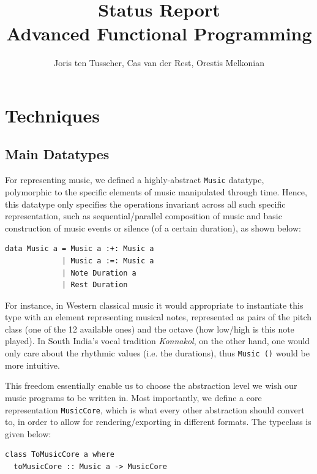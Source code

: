 \documentclass[11pt,a4paper]{article}
\title{\textbf{Status Report \\ \small{Advanced Functional Programming}}}
\author{\small{Joris ten Tusscher, Cas van der Rest, Orestis Melkonian}}
\date{}
\newcommand{\icode}[1]{\texttt{#1}}
\begin{document}
\maketitle

\section{Techniques}

\subsection{Main Datatypes}
For representing music, we defined a highly-abstract \icode{Music} datatype, polymorphic to the specific elements of music manipulated through time. Hence, this datatype only specifies the operations invariant across all such specific representation, such as sequential/parallel composition of music and basic construction of music events or silence (of a certain duration), as shown below:

\begin{center}\begin{minipage}{0.5\textwidth}\begin{verbatim}
data Music a = Music a :+: Music a
             | Music a :=: Music a
             | Note Duration a
             | Rest Duration
\end{verbatim}
\end{minipage}
\end{center}

For instance, in Western classical music it would appropriate to instantiate this type with an element representing 
musical notes, represented as pairs of the pitch class (one of the 12 available ones) and the octave (how low/high is this note played). In South India's vocal tradition \textit{Konnakol}, on the other hand, one would only care about the rhythmic values (i.e. the durations), thus \icode{Music ()} would be more intuitive.

This freedom essentially enable us to choose the abstraction level we wish our music programs to be written in. Most importantly, we define a core representation \icode{MusicCore}, which is what every other abstraction should convert to, in order to allow for rendering/exporting in different formats. The typeclass is given below:

\begin{center}\begin{minipage}{0.5\textwidth}\begin{verbatim}
class ToMusicCore a where
  toMusicCore :: Music a -> MusicCore
\end{verbatim}
\end{minipage}
\end{center}
\end{document}

